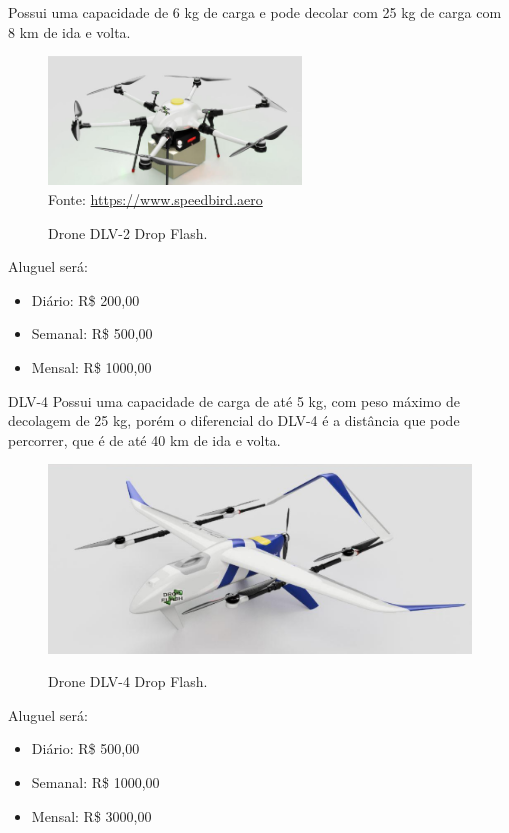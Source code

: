 Possui uma capacidade de 6 kg de carga e pode decolar com 25 kg de carga com 8 km de ida e volta.

\begin{figure}[!ht]
    \centering
    \caption{Drone DLV-2 Drop Flash.}
    \includegraphics[width=0.6\textwidth]{figuras/Dlv 2.png}
    \label{fig:DLV2}\\
    \small Fonte: \url{https://www.speedbird.aero}
\end{figure}

Aluguel será: 
\begin{itemize}
    \item Diário: R\$ 200,00
    \item Semanal: R\$ 500,00
    \item Mensal: R\$ 1000,00
\end{itemize}

DLV-4 Possui uma capacidade de carga de até 5 kg, com peso máximo de decolagem de 25 kg, porém o diferencial do DLV-4 é a distância que pode percorrer, que é de até 40 km de ida e volta.

\begin{figure} [!ht]
   { \centering
    \caption{Drone DLV-4 Drop Flash.}
    \includegraphics[width=0.6\linewidth]{figuras/dlv 4.png}
    \label{fig:enter-label}
    }
\end{figure}

Aluguel será: 

\begin{itemize}
    \item Diário: R\$ 500,00
    \item Semanal: R\$ 1000,00
    \item Mensal: R\$ 3000,00
\end{itemize}

